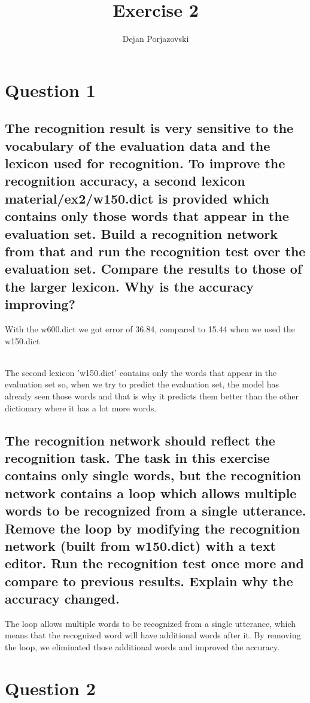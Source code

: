 \documentclass[17pt]{article}
\begin{document}
\title{{Exercise 2}}
\author{Dejan Porjazovski}
\maketitle

\section{Question 1}

\subsection{The recognition result is very sensitive to the vocabulary of the evaluation data and the lexicon used for recognition. To improve the recognition accuracy, a second lexicon material/ex2/w150.dict is provided which contains only those words that appear in the evaluation set. Build a recognition network from that and run the recognition test over the evaluation set. Compare the results to those of the larger lexicon. Why is the accuracy improving?}

With the w600.dict we got error of 36.84, compared to 15.44 when we used the w150.dict \\~\

The second lexicon 'w150.dict' contains only the words that appear in the
evaluation set so, when we try to predict the evaluation set, the model has already seen those words and that is why it predicts them better than the other dictionary where it has a lot more words. 

\subsection{The recognition network should reflect the recognition task. The task in this exercise contains only single words, but the recognition network contains a loop which allows multiple words to be recognized from a single utterance. Remove the loop by modifying the recognition network (built from w150.dict) with a text editor. Run the recognition test once more and compare to previous results. Explain why the accuracy changed.}

The loop allows multiple words to be recognized from a single utterance,
which means that the recognized word will have additional words after it.
By removing the loop, we eliminated those additional words and improved the accuracy.


\section{Question 2}
\end{document}
